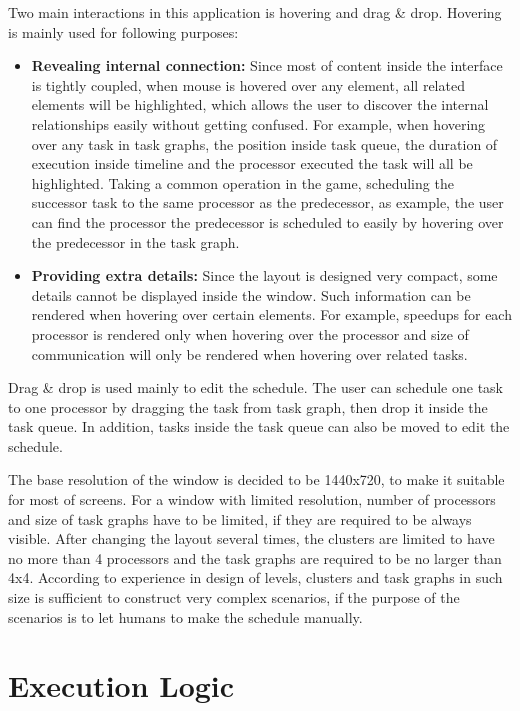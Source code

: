 \documentclass[msc,deptreport, cs]{infthesis}
\begin{document}
Two main interactions in this application is hovering and drag \& drop. Hovering is mainly used for following purposes:

\begin{itemize}
  \item \textbf{Revealing internal connection:} Since most of content inside the interface is tightly coupled, when mouse is hovered over any element, all related elements will be highlighted, which allows the user to discover the internal relationships easily without getting confused. For example, when hovering over any task in task graphs, the position inside task queue, the duration of execution inside timeline and the processor executed the task will all be highlighted. Taking a common operation in the game, scheduling the successor task to the same processor as the predecessor, as example, the user can find the processor the predecessor is scheduled to easily by hovering over the predecessor in the task graph.
  \item \textbf{Providing extra details:} Since the layout is designed very compact, some details cannot be displayed inside the window. Such information can be rendered when hovering over certain elements. For example, speedups for each processor is rendered only when hovering over the processor and size of communication will only be rendered when hovering over related tasks.
\end{itemize}

Drag \& drop is used mainly to edit the schedule. The user can schedule one task to one processor by dragging the task from task graph, then drop it inside the task queue. In addition, tasks inside the task queue can also be moved to edit the schedule.

The base resolution of the window is decided to be 1440x720, to make it suitable for most of screens. For a window with limited resolution, number of processors and size of task graphs have to be limited, if they are required to be always visible. After changing the layout several times, the clusters are limited to have no more than 4 processors and the task graphs are required to be no larger than 4x4. According to experience in design of levels, clusters and task graphs in such size is sufficient to construct very complex scenarios, if the purpose of the scenarios is to let humans to make the schedule manually.

\section{Execution Logic}
\end{document}
